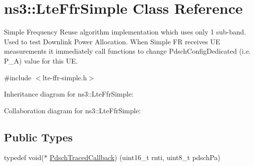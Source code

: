 \hypertarget{classns3_1_1LteFfrSimple}{}\section{ns3\+:\+:Lte\+Ffr\+Simple Class Reference}
\label{classns3_1_1LteFfrSimple}


Simple Frequency Reuse algorithm implementation which uses only 1 sub-\/band. Used to test Downlink Power Allocation. When Simple FR receives UE measurements it immediately call functions to change Pdsch\+Config\+Dedicated (i.\+e. P\+\_\+A) value for this UE.  




{\ttfamily \#include $<$lte-\/ffr-\/simple.\+h$>$}



Inheritance diagram for ns3\+:\+:Lte\+Ffr\+Simple\+:


Collaboration diagram for ns3\+:\+:Lte\+Ffr\+Simple\+:
\subsection*{Public Types}
\begin{DoxyCompactItemize}
\item 
typedef void($\ast$ \hyperlink{classns3_1_1LteFfrSimple_a3c39183fd18791e291a3b63c841cbfa5}{Pdsch\+Traced\+Callback}) (uint16\+\_\+t rnti, uint8\+\_\+t pdsch\+Pa)
\end{DoxyCompactItemize}
